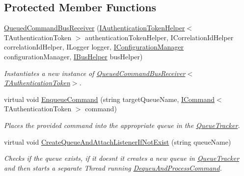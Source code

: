 \subsection*{Protected Member Functions}
\begin{DoxyCompactItemize}
\item 
\hyperlink{classCqrs_1_1Bus_1_1QueuedCommandBusReceiver_aa5158357f8e2007f06b640d4a4129781_aa5158357f8e2007f06b640d4a4129781}{Queued\+Command\+Bus\+Receiver} (\hyperlink{interfaceCqrs_1_1Authentication_1_1IAuthenticationTokenHelper}{I\+Authentication\+Token\+Helper}$<$ T\+Authentication\+Token $>$ authentication\+Token\+Helper, I\+Correlation\+Id\+Helper correlation\+Id\+Helper, I\+Logger logger, \hyperlink{interfaceCqrs_1_1Configuration_1_1IConfigurationManager}{I\+Configuration\+Manager} configuration\+Manager, \hyperlink{interfaceCqrs_1_1Bus_1_1IBusHelper}{I\+Bus\+Helper} bus\+Helper)
\begin{DoxyCompactList}\small\item\em Instantiates a new instance of \hyperlink{classCqrs_1_1Bus_1_1QueuedCommandBusReceiver_aa5158357f8e2007f06b640d4a4129781_aa5158357f8e2007f06b640d4a4129781}{Queued\+Command\+Bus\+Receiver$<$\+T\+Authentication\+Token$>$}. \end{DoxyCompactList}\item 
virtual void \hyperlink{classCqrs_1_1Bus_1_1QueuedCommandBusReceiver_ab27ff7119814cdc22bf9a5811340e4e7_ab27ff7119814cdc22bf9a5811340e4e7}{Enqueue\+Command} (string target\+Queue\+Name, \hyperlink{interfaceCqrs_1_1Commands_1_1ICommand}{I\+Command}$<$ T\+Authentication\+Token $>$ command)
\begin{DoxyCompactList}\small\item\em Places the provided {\itshape command}  into the appropriate queue in the \hyperlink{classCqrs_1_1Bus_1_1QueuedCommandBusReceiver_a2fc62989429929acd8ea66808a8c4a78_a2fc62989429929acd8ea66808a8c4a78}{Queue\+Tracker}. \end{DoxyCompactList}\item 
virtual void \hyperlink{classCqrs_1_1Bus_1_1QueuedCommandBusReceiver_ad703e46b4a8318debac37ea747163f30_ad703e46b4a8318debac37ea747163f30}{Create\+Queue\+And\+Attach\+Listener\+If\+Not\+Exist} (string queue\+Name)
\begin{DoxyCompactList}\small\item\em Checks if the queue exists, if it doesn\textquotesingle{}t it creates a new queue in \hyperlink{classCqrs_1_1Bus_1_1QueuedCommandBusReceiver_a2fc62989429929acd8ea66808a8c4a78_a2fc62989429929acd8ea66808a8c4a78}{Queue\+Tracker} and then starts a separate Thread running \hyperlink{classCqrs_1_1Bus_1_1QueuedCommandBusReceiver_a6e00e819b9738c694fd05815938cb433_a6e00e819b9738c694fd05815938cb433}{Dequeu\+And\+Process\+Command}. \end{DoxyCompactList}\item 

\end{DoxyCompactItemize}
